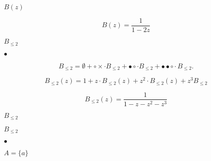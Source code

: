 \documentclass[10pt]{book}
\begin{document}
\begin{mdSnippets}
\begin{mdDisplaySnippet}[3359a0ee5a38412f5b8a9a46108a25b2]
\[\]%
\end{mdDisplaySnippet}%
\begin{mdInlineSnippet}[73723f147a6eb605351fc7f278dcecef]%
$B(z)$\end{mdInlineSnippet}%
\begin{mdDisplaySnippet}[0ff8cbcdaa74bf811c9d6c11d98b136b]%
\[%
B(z) = \frac{1}{1-2z}
\]%
\end{mdDisplaySnippet}%
\begin{mdInlineSnippet}[1115e702e0237b316fbda63a111a29e5]%
$B_{\leq 2}$\end{mdInlineSnippet}%
\begin{mdInlineSnippet}[71976219fb1234a4f2ba6bef7a046183]%
$\bullet$\end{mdInlineSnippet}%
\begin{mdDisplaySnippet}[76100419ded65de5176c361a72d8235b]%
\[%
B_{\leq2} = \emptyset + \circ\times \cdot B_{\leq2} + \bullet\circ \cdot B_{\leq2} 
+\bullet\bullet\circ \cdot B_{\leq2}.
\]%
\end{mdDisplaySnippet}%
\begin{mdDisplaySnippet}[59e23d24b1c0fc680c52b781f7c52136]%
\[%
B_{\leq2}(z) = 1 + z\cdot B_{\leq 2}(z) + z^2\cdot B_{\leq 2}(z)+z^3 B_{\leq2}
\]%
\end{mdDisplaySnippet}%
\begin{mdDisplaySnippet}[03b813d449780dc7000064dd40b5bf64]%
\[%
B_{\leq2}(z)  = \frac{1}{1 - z - z^2 - z^3}
\]%
\end{mdDisplaySnippet}%
\begin{mdInlineSnippet}[79cb4a2c6de0786af0273a19f0234091]%
$B_{\leq2}$\end{mdInlineSnippet}%
\begin{mdInlineSnippet}[79cb4a2c6de0786af0273a19f0234091]%
$B_{\leq2}$\end{mdInlineSnippet}%
\begin{mdInlineSnippet}[71976219fb1234a4f2ba6bef7a046183]%
$\bullet$\end{mdInlineSnippet}%
\begin{mdInlineSnippet}[0f5695a0c392b0bcdebbee6d6e48b350]%
$A = \{a\}$\end{mdInlineSnippet}%

\end{mdSnippets}
\end{document}
